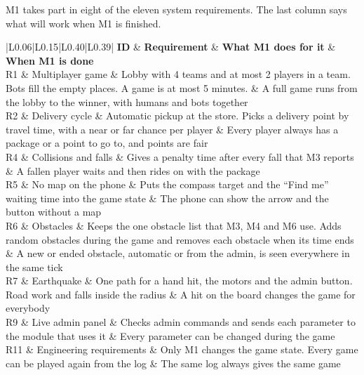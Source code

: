 \documentclass[
  english,
  10pt,
  a4paper,
]{article}
\newcommand{\ckkeep}[1]{\par\noindent\begin{minipage}{\linewidth}\setlength{\parskip}{4pt}#1\end{minipage}\par\smallskip}
\begin{document}
\ckkeep{%
M1 takes part in eight of the eleven system requirements. The last column says what will work when
M1 is finished.

\begin{tabular}{|L{0.06}|L{0.15}|L{0.40}|L{0.39}|}
\hline \textbf{ID} & \textbf{Requirement} & \textbf{What M1 does for it} & \textbf{When M1 is done} \\ \hline 
R1 & Multiplayer game & Lobby with 4 teams and at most 2 players in a team. Bots fill the empty places. A game is at most 5 minutes. & A full game runs from the lobby to the winner, with humans and bots together \\ \hline
R2 & Delivery cycle & Automatic pickup at the store. Picks a delivery point by travel time, with a near or far chance per player & Every player always has a package or a point to go to, and points are fair \\ \hline
R4 & Collisions and falls & Gives a penalty time after every fall that M3 reports & A fallen player waits and then rides on with the package \\ \hline
R5 & No map on the phone & Puts the compass target and the ``Find me'' waiting time into the game state & The phone can show the arrow and the button without a map \\ \hline
R6 & Obstacles & Keeps the one obstacle list that M3, M4 and M6 use. Adds random obstacles during the game and removes each obstacle when its time ends & A new or ended obstacle, automatic or from the admin, is seen everywhere in the same tick \\ \hline
R7 & Earthquake & One path for a hand hit, the motors and the admin button. Road work and falls inside the radius & A hit on the board changes the game for everybody \\ \hline
R9 & Live admin panel & Checks admin commands and sends each parameter to the module that uses it & Every parameter can be changed during the game \\ \hline
R11 & Engineering requirements & Only M1 changes the game state. Every game can be played again from the log & The same log always gives the same game \\ \hline
\end{tabular}}

\end{document}
